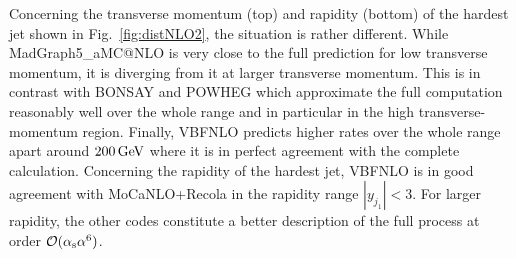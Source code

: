 Concerning the transverse momentum (top) and rapidity (bottom) of the hardest jet shown in Fig.~\ref{fig:distNLO2}, the situation is rather different.
While {\sc MadGraph5\_aMC@NLO} is very close to the full prediction for low transverse momentum, it is diverging from it at larger transverse momentum.
This is in contrast with {\sc BONSAY} and {\sc POWHEG} which approximate the full computation reasonably well over the whole range and in particular in the high transverse-momentum region.
Finally, {\sc VBFNLO} predicts higher rates over the whole range apart around $200\,\text{GeV}$ where it is in perfect agreement with the complete calculation.
Concerning the rapidity of the hardest jet, {\sc VBFNLO} is in good agreement with {\sc MoCaNLO}+{\sc Recola} in the rapidity range $|y_{j_1}| < 3$.
For larger rapidity, the other codes constitute a better description of the full process at order $\mathcal{O}(\alpha_{\rm s}\alpha^6)$.


